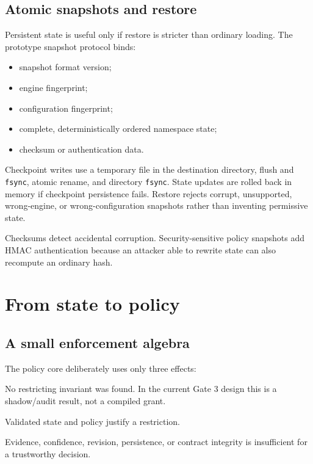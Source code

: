 \documentclass[11pt,a4paper]{article}
\begin{document}
\subsection{Atomic snapshots and restore}

Persistent state is useful only if restore is stricter than ordinary loading.
The prototype snapshot protocol binds:

\begin{itemize}[leftmargin=*]
  \item snapshot format version;
  \item engine fingerprint;
  \item configuration fingerprint;
  \item complete, deterministically ordered namespace state;
  \item checksum or authentication data.
\end{itemize}

Checkpoint writes use a temporary file in the destination directory, flush and
\texttt{fsync}, atomic rename, and directory \texttt{fsync}. State updates are
rolled back in memory if checkpoint persistence fails. Restore rejects corrupt,
unsupported, wrong-engine, or wrong-configuration snapshots rather than
inventing permissive state.

Checksums detect accidental corruption. Security-sensitive policy snapshots
add HMAC authentication because an attacker able to rewrite state can also
recompute an ordinary hash.

\section{From state to policy}

\subsection{A small enforcement algebra}

The policy core deliberately uses only three effects:

\begin{description}[leftmargin=2.4cm,style=nextline]
  \item[\texttt{ALLOW}] No restricting invariant was found. In the current
        Gate 3 design this is a shadow/audit result, not a compiled grant.
  \item[\texttt{DENY}] Validated state and policy justify a restriction.
  \item[\texttt{ABSTAIN}] Evidence, confidence, revision, persistence, or
        contract integrity is insufficient for a trustworthy decision.
\end{description}
\end{document}
